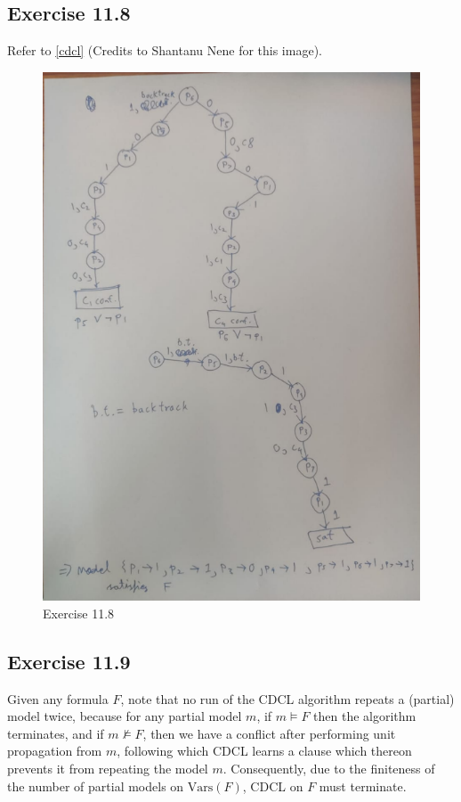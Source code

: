 \documentclass{article}
\newcommand{\Vars}{\mathrm{Vars}}
\begin{document}
\subsection*{Exercise 11.8}
Refer to \autoref{cdcl} (Credits to Shantanu Nene for this image).
\begin{figure}[h]
	\centering
	\includegraphics[scale=1]{CDCL_run.PNG}
	\caption{Exercise 11.8}
    \label{cdcl}
\end{figure}
\subsection*{Exercise 11.9}
Given any formula $F$, note that no run of the CDCL algorithm repeats a (partial) model twice, because for any partial model $m$, if $m\models F$ then the algorithm terminates, and if $m\not\models F$, then we have a conflict after performing unit propagation from $m$, following which CDCL learns a clause which thereon prevents it from repeating the model $m$. Consequently, due to the finiteness of the number of partial models on $\Vars(F)$, CDCL on $F$ must terminate.
\end{document}
